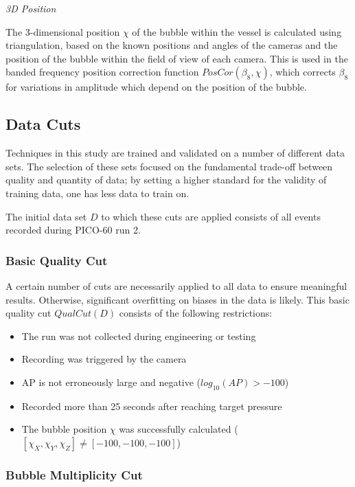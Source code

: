 \documentclass[10pt]{article}
\begin{document}
\textit{3D Position}

The 3-dimensional position $\chi$ of the bubble within the vessel is calculated using triangulation, based on the known positions and angles of the cameras and the position of the bubble within the field of view of each camera. This is used in the banded frequency position correction function $PosCor(\beta _{8}, \chi)$, which corrects $\beta _{8}$ for variations in amplitude which depend on the position of the bubble.

\subsection{Data Cuts}

Techniques in this study are trained and validated on a number of different data sets. The selection of these sets focused on the fundamental trade-off between quality and quantity of data; by setting a higher standard for the validity of training data, one has less data to train on.

The initial data set $D$ to which these cuts are applied consists of all events recorded during PICO-60 run 2.

\subsubsection{Basic Quality Cut}

A certain number of cuts are necessarily applied to all data to ensure meaningful results. Otherwise, significant overfitting on biases in the data is likely. This basic quality cut $QualCut(D)$ consists of the following restrictions:

\begin{itemize}
    \item The run was not collected during engineering or testing
    \item Recording was triggered by the camera
    \item AP is not erroneously large and negative ($log_{10}(AP)>-100$)
    \item Recorded more than 25 seconds after reaching target pressure
    \item The bubble position $\chi$ was successfully calculated ($[\chi_{X}, \chi_{Y}, \chi_{Z}]\neq[-100, -100, -100]$)
\end{itemize}

\subsubsection{Bubble Multiplicity Cut}
\end{document}
